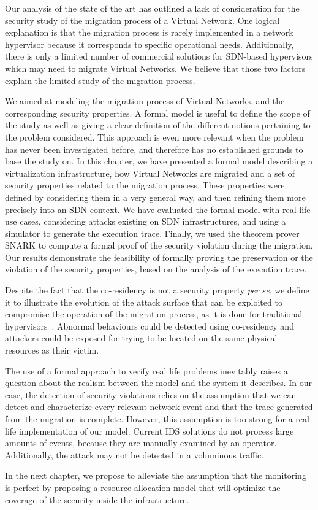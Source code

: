 Our analysis of the state of the art has outlined a lack of consideration for the security study of the migration process of a Virtual Network.
One logical explanation is that the migration process is rarely implemented in a network hypervisor because it corresponds to specific operational needs. Additionally, there is only a limited number of commercial solutions for SDN-based hypervisors which may need to migrate Virtual Networks. We believe that those two factors explain the limited study of the migration process.


We aimed at modeling the migration process of Virtual Networks, and the corresponding security properties.
A formal model is useful to define the scope of the study as well as giving a clear definition of the different notions pertaining to the problem considered.
This approach is even more relevant when the problem has never been investigated before, and therefore has no established grounds to base the study on.
In this chapter, we have presented a formal model describing a virtualization infrastructure, how Virtual Networks are migrated  and a set of security properties related to the migration process. These properties were defined by considering them in a very general way, and then refining them more precisely into an SDN context. We have evaluated the formal model with real life use cases, considering attacks existing on SDN infrastructures, and using a simulator to generate the execution trace. Finally, we used the theorem prover SNARK to compute a formal proof of the security violation during the migration. Our results demonstrate the feasibility of formally proving the preservation or the violation of the security properties, based on the analysis of the execution trace.

Despite the fact that the co-residency is not a security property \textit{per se}, we define it to illustrate the evolution of the attack surface that can be exploited to compromise the operation of the migration process, as it is done for traditional hypervisors~\cite{stalling-atya2017,malicious-atya2017}.
Abnormal behaviours could be detected using co-residency and attackers could be exposed for trying to be located on the same physical resources as their victim. 

The use of a formal approach to verify real life problems inevitably raises a question about the realism between the model and the system it describes.
In our case, the detection of security violations relies on the assumption that we can detect and characterize every relevant network event and that the trace generated from the migration is complete. However, this assumption is too strong for a real life implementation of our model. Current IDS solutions do not process large amounts of events, because they are manually examined by an operator.
Additionally, the attack may not be detected in a voluminous traffic.

In the next chapter, we propose to alleviate the assumption that the monitoring is perfect by proposing a resource allocation model that will optimize the coverage of the security inside the infrastructure.